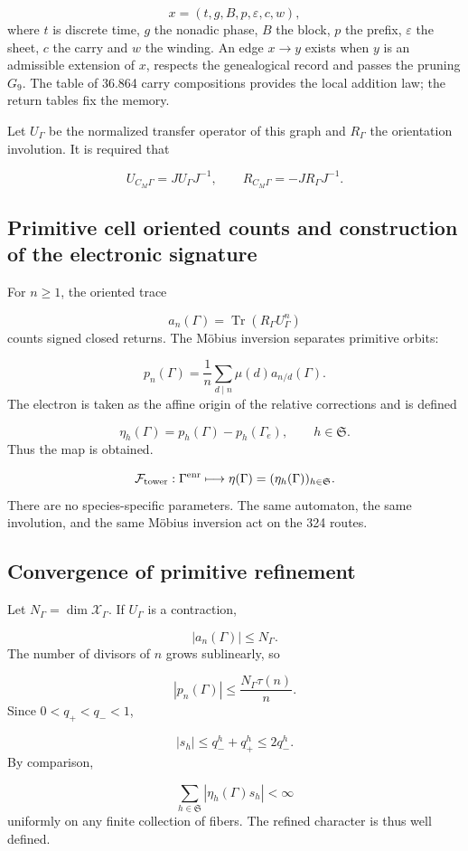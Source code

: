 \[
 x=(t,g,B,p,\varepsilon,c,w),
\]
where \(t\) is discrete time, \(g\) the nonadic phase, \(B\) the block, \(p\) the prefix, \(\varepsilon\) the sheet, \(c\) the carry and \(w\) the winding. An edge \(x\to y\) exists when \(y\) is an admissible extension of \(x\), respects the genealogical record and passes the pruning \(G_9\). The table of 36.864 carry compositions provides the local addition law; the return tables fix the memory.

Let \(U_\Gamma\) be the normalized transfer operator of this graph and \(R_\Gamma\) the orientation involution. It is required that

\[
 U_{C_M\Gamma}=J U_\Gamma J^{-1},\qquad
 R_{C_M\Gamma}=-J R_\Gamma J^{-1}.
\]
\subsection{Primitive cell oriented counts and construction of the electronic signature}
For \(n\ge1\), the oriented trace

\[
 a_n(\Gamma)=\operatorname{Tr}(R_\Gamma U_\Gamma^n)
\]
counts signed closed returns. The Möbius inversion separates primitive orbits:

\[
 p_n(\Gamma)
 =\frac1n\sum_{d\mid n}\mu(d)a_{n/d}(\Gamma).
\]
The electron is taken as the affine origin of the relative corrections and is defined

\[
 \boxed{
 \eta_h(\Gamma)=p_h(\Gamma)-p_h(\Gamma_e),
 \qquad h\in\mathfrak S.}
\]
Thus the map is obtained.

\[
 \mathcal F_{\rm tower}:
 \Gamma^{\rm enr}\longmapsto
 \eta(\Gamma)=(\eta_h(\Gamma))_{h\in\mathfrak S}.
\]
There are no species-specific parameters. The same automaton, the same involution, and the same Möbius inversion act on the 324 routes.

\subsection{Convergence of primitive refinement}
Let \(N_\Gamma=\dim\mathscr X_\Gamma\). If \(U_\Gamma\) is a contraction,

\[
 |a_n(\Gamma)|\le N_\Gamma.
\]
The number of divisors of \(n\) grows sublinearly, so

\[
 |p_n(\Gamma)|
 \le\frac{N_\Gamma\tau(n)}n.
\]
Since \(0<q_+<q_-<1\),

\[
 |s_h|\le q_-^h+q_+^h\le2q_-^h.
\]
By comparison,

\[
 \sum_{h\in\mathfrak S}|\eta_h(\Gamma)s_h|<\infty
\]
uniformly on any finite collection of fibers. The refined character is thus well defined.

